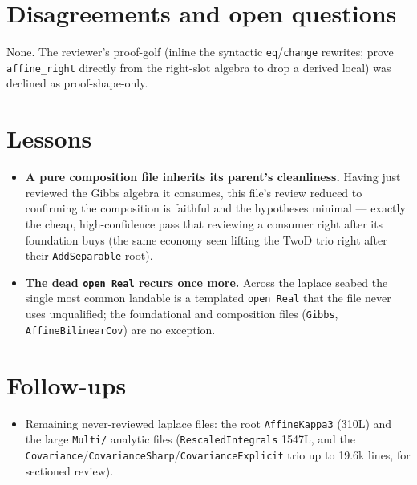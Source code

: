 \documentclass[11pt]{article}
\begin{document}
\section{Disagreements and open questions}
None. The reviewer's proof-golf (inline the syntactic \texttt{eq}/\texttt{change} rewrites; prove
\texttt{affine\_right} directly from the right-slot algebra to drop a derived local) was declined as
proof-shape-only.

\section{Lessons}
\begin{itemize}[noitemsep]
  \item \textbf{A pure composition file inherits its parent's cleanliness.} Having just reviewed the
    Gibbs algebra it consumes, this file's review reduced to confirming the composition is faithful and
    the hypotheses minimal --- exactly the cheap, high-confidence pass that reviewing a consumer right
    after its foundation buys (the same economy seen lifting the TwoD trio right after their
    \texttt{AddSeparable} root).
  \item \textbf{The dead \texttt{open Real} recurs once more.} Across the laplace seabed the single most
    common landable is a templated \texttt{open Real} that the file never uses unqualified; the
    foundational and composition files (\texttt{Gibbs}, \texttt{AffineBilinearCov}) are no exception.
\end{itemize}

\section{Follow-ups}
\begin{itemize}[noitemsep]
  \item Remaining never-reviewed laplace files: the root \texttt{AffineKappa3} (310L) and the large
    \texttt{Multi/} analytic files (\texttt{RescaledIntegrals} 1547L, and the
    \texttt{Covariance}/\texttt{CovarianceSharp}/\texttt{CovarianceExplicit} trio up to 19.6k lines,
    for sectioned review).
\end{itemize}
\end{document}

